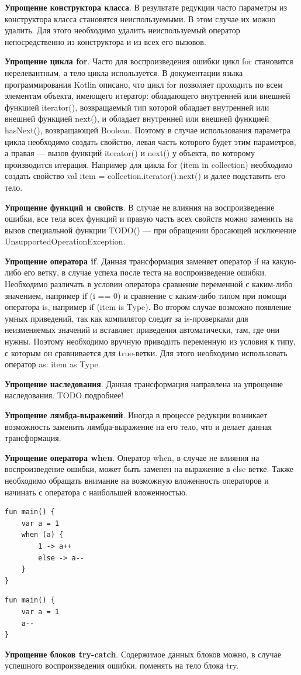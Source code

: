 \textbf{Упрощение конструктора класса}. В результате редукции часто параметры из конструктора класса становятся неиспользуемыми. В этом случае их можно удалить. Для этого необходимо удалить неиспользуемый оператор непосредственно из конструктора и из всех его вызовов.

\textbf{Упрощение цикла for}. Часто для воспроизведения ошибки цикл for становится нерелевантным, а тело цикла используется. В документации языка программирования Kotlin описано, что цикл for позволяет проходить по всем элементам объекта, имеющего итератор:
обладающего внутренней или внешней функцией iterator(), возвращаемый тип которой обладает внутренней или внешней функцией next(), и обладает внутренней или внешней функцией hasNext(), возвращающей Boolean. Поэтому в случае использования параметра цикла необходимо создать свойство, левая часть которого будет этим параметров, а правая --- вызов функций iterator() и next() у объекта, по которому производится итерация. Например для цикла {\ttfamily for (item in collection)} необходимо создать свойство {\ttfamily val item = collection.iterator().next()} и далее подставить его тело.

\textbf{Упрощение функций и свойств}. В случае не влияния на воспроизведение ошибки, все тела всех функций и правую часть всех свойств можно заменить на вызов специальной функции TODO() --- при обращении бросающей исключение UnsupportedOperationException.

\textbf{Упрощение оператора if}. Данная трансформация заменяет оператор if на какую-либо его ветку, в случае успеха после теста на воспроизведение ошибки. Необходимо различать в условии оператора сравнение переменной с каким-либо значением, например if (i == 0) и сравнение с каким-либо типом при помощи оператора is, например if (item is Type). Во втором случае возможно появление умных приведений, так как компилятор следит за is-проверками для неизменяемых значений и вставляет приведения автоматически, там, где они нужны. Поэтому необходимо вручную приводить переменную из условия к типу, с которым он сравнивается для true-ветки. Для этого необходимо использовать оператор as: item as Type.

\textbf{Упрощение наследования}. Данная трансформация направлена на упрощение наследования. TODO подробнее!

\textbf{Упрощение лямбда-выражений}. Иногда в процессе редукции возникает возможность заменить лямбда-выражение на его тело, что и делает данная трансформация. 

\textbf{Упрощение оператора when}. Оператор when, в случае не влияния на воспроизведение ошибки, может быть заменен на выражение в else ветке. Также необходимо обращать внимание на возможную вложенность операторов и начинать с оператора с наибольшей вложенностью.
\begin{lstlisting}
fun main() {
    var a = 1
    when (a) {
        1 -> a++
        else -> a--
    }
}
\end{lstlisting}
\begin{lstlisting}
fun main() {
    var a = 1
    a--
}
\end{lstlisting}
\textbf{Упрощение блоков try-catch}. Содержимое данных блоков можно, в случае успешного воспроизведения ошибки, поменять на тело блока try.


